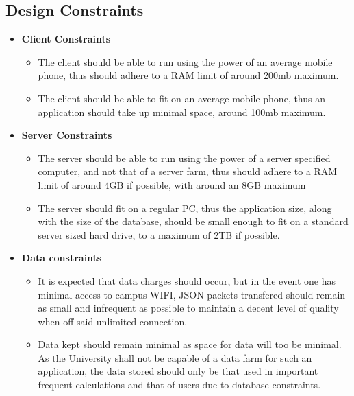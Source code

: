 \documentclass{article}
\begin{document}
		\pagebreak
		
		\subsection{Design Constraints}
		
			\begin{itemize}
				
				\item \textbf{Client Constraints}
				
				\begin{itemize}
					\item The client should be able to run using the power of an average mobile phone, thus should adhere to a RAM limit of around 200mb maximum.
					\item The client should be able to fit on an average mobile phone, thus an application should take up minimal space, around 100mb maximum.
				\end{itemize}	
				
			\end{itemize}
		
			\begin{itemize}
				
				\item \textbf{Server Constraints}
				
				\begin{itemize}
					\item The server should be able to run using the power of a server specified computer, and not that of a server farm, thus should adhere to a RAM limit of around 4GB if possible, with around an 8GB maximum
					\item The server should fit on a regular PC, thus the application size, along with the size of the database, should be small enough to fit on a standard server sized hard drive, to a maximum of 2TB if possible.
				\end{itemize}	
				
			\end{itemize}
		
			\begin{itemize}
				
				\item \textbf{Data constraints}
				
				\begin{itemize}
					\item It is expected that data charges should occur, but in the event one has minimal access to campus WIFI, JSON packets transfered should remain as small and infrequent as possible to maintain a decent level of quality when off said unlimited connection.
					\item Data kept should remain minimal as space for data will too be minimal. As the University shall not be capable of a data farm for such an application, the data stored should only be that used in important frequent calculations and that of users due to database constraints. 
				\end{itemize}	
				
			\end{itemize}
		
\end{document}
